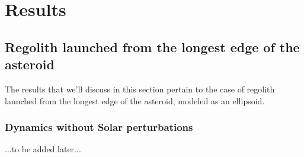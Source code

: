 \chapter{Results}
\label{chap:results}
\graphicspath{{Results/Images/}}

\section{Regolith launched from the longest edge of the asteroid}
\label{regolith_longest_edge}
The results that we'll discuss in this section pertain to the case of regolith launched from the longest edge of the asteroid, modeled as an ellipsoid.

\subsection{Dynamics without Solar perturbations}
\label{regolith_longest_edge_without_solar}
...to be added later...

